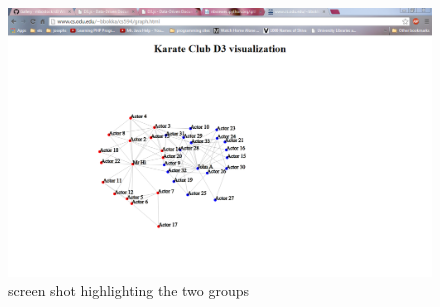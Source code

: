 \documentclass[12pt]{article}
\begin{document}
\begin{figure}[ht]
\includegraphics[scale=0.6]{../splitHighLlight}
\centering
\caption{screen shot highlighting the two groups}
\label{fig:after split}
\end{figure}
\newpage


\cite{*}
\end{document}
